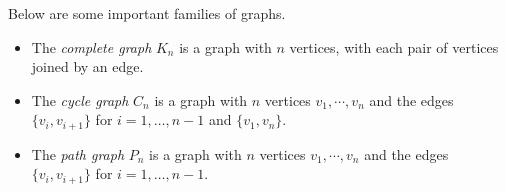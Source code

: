 

\setcounter{section}{1}
\setcounter{subsection}{2}
\setcounter{dfn}{1}

Below are some important families of graphs.
\begin{itemize}
\item
The \emph{complete graph} $K_n$ is a graph with $n$ vertices, with each pair of vertices joined by an edge.
\item
The \emph{cycle graph} $C_n$ is a graph with $n$ vertices $v_1, \cdots, v_n$ and the edges $\{v_i, v_{i+1}\}$ for $i = 1, \ldots, n-1$ and $\{v_1, v_n\}$.
\item
The \emph{path graph} $P_n$ is a graph with $n$ vertices $v_1, \cdots, v_n$ and the edges $\{v_i, v_{i+1}\}$ for $i = 1, \ldots, n-1$.
\end{itemize}



